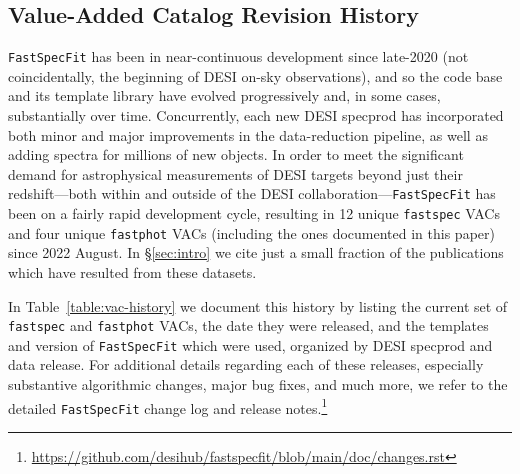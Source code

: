 \documentclass[modern,linenumbers]{aastex702}
\newcommand{\fastspecfit}{\texttt{FastSpecFit}}
\newcommand{\fastspec}{\texttt{fastspec}}
\newcommand{\fastphot}{\texttt{fastphot}}
\begin{document}
\begin{appendix}
\section{Value-Added Catalog Revision History}
\label{sec:appendix_vacs}

\fastspecfit{} has been in near-continuous development since late-2020
(not coincidentally, the beginning of DESI on-sky observations), and
so the code base and its template library have evolved progressively
and, in some cases, substantially over time. Concurrently, each new
DESI specprod has incorporated both minor and major improvements in
the data-reduction pipeline, as well as adding spectra for millions of
new objects. In order to meet the significant demand for astrophysical
measurements of DESI targets beyond just their redshift---both within
and outside of the DESI collaboration---\fastspecfit{} has been on a
fairly rapid development cycle, resulting in 12 unique \fastspec{}
VACs and four unique \fastphot{} VACs (including the ones documented
in this paper) since 2022 August. In \S\ref{sec:intro} we cite just a
small fraction of the publications which have resulted from these
datasets.



In Table~\ref{table:vac-history} we document this history by listing
the current set of \fastspec{} and \fastphot{} VACs, the date they
were released, and the templates and version of \fastspecfit{} which
were used, organized by DESI specprod and data release. For additional
details regarding each of these releases, especially substantive
algorithmic changes, major bug fixes, and much more, we refer to the
detailed \fastspecfit{} change log and release
notes.\footnote{\url{https://github.com/desihub/fastspecfit/blob/main/doc/changes.rst}}


\end{appendix}
\end{document}
